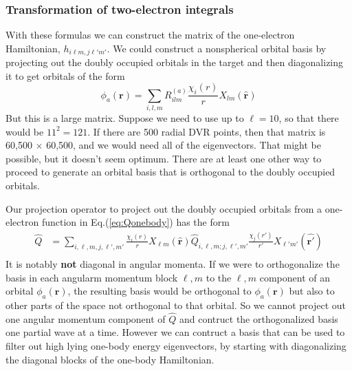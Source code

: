 \documentclass[%
pra%
,twocolumn%
,amssymb, nobibnotes, aps,
longbibliography
]{revtex4-1}
\begin{document}
\subsubsection{Transformation of two-electron integrals}
With these formulas we can construct the matrix of the one-electron Hamiltonian,
$h_{i \ell m, j \ell' m'}$.  We could construct a nonspherical orbital basis by projecting 
out the doubly occupied orbitals in the target and then diagonalizing it to get orbitals of the 
form
\begin{equation}
\phi_a(\mathbf{r}) = \sum_{i,l,m} R^{(a)}_{ilm} \frac{\chi_i(r)}{r} X_{lm} (  \mathbf{\hat{r}} )
\end{equation} 
But this is a large matrix. Suppose we need to use up to $\ell = 10$, so that there would be $11^2 = 121$.  If there are 500 radial DVR points, then that matrix is 60,500 $\times$ 60,500, and we would need all of the eigenvectors.  That might be possible, but it doesn't seem optimum.   There are at least one other way to proceed to generate an orbital basis that is orthogonal to the doubly occupied orbitals.

Our projection operator to project out the doubly occupied orbitals from a one-electron function in Eq.(\ref{eq:Qonebody}) has the form
\begin{equation}
\begin{split}
\hat{Q}&=  \sum_{i ,\ell,m, j, \ell',m'} \frac{\chi_i(r)}{r} X_{\ell m} (  \mathbf{\hat{r}} )\hat{Q}_{i,\ell,m ; j, \ell',m'}   \frac{ \chi_j(r') }{r'} X_{\ell' m'} (  \mathbf{\hat{r'}} ) \\
\end{split}
\label{eq:Q1}
\end{equation}
It is notably \textbf{not} diagonal in angular momenta.  If we were to orthogonalize the basis in each angularm momentum block $\ell,m$ to the $\ell,m$ component of an orbital $\phi_a(\mathbf{r})$, the resulting basis would be orthogonal to $\phi_a(\mathbf{r})$ but also to other parts of the space not orthogonal to that orbital.  So we cannot project out one angular momentum component of $\hat{Q}$ and contruct the orthogonalized basis one partial wave at a time.  However we can contruct a basis that can be used to filter out high lying one-body energy eigenvectors, by starting with diagonalizing the diagonal blocks of the one-body Hamiltonian.
\end{document}
